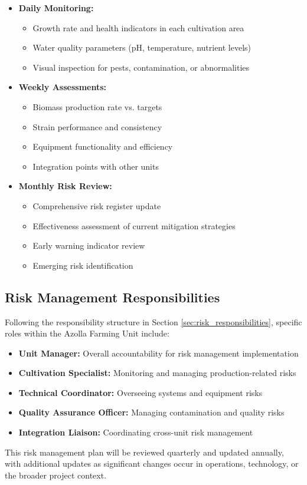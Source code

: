\begin{itemize}
    \item \textbf{Daily Monitoring:}
    \begin{itemize}
        \item Growth rate and health indicators in each cultivation area
        \item Water quality parameters (pH, temperature, nutrient levels)
        \item Visual inspection for pests, contamination, or abnormalities
    \end{itemize}
    
    \item \textbf{Weekly Assessments:}
    \begin{itemize}
        \item Biomass production rate vs. targets
        \item Strain performance and consistency
        \item Equipment functionality and efficiency
        \item Integration points with other units
    \end{itemize}
    
    \item \textbf{Monthly Risk Review:}
    \begin{itemize}
        \item Comprehensive risk register update
        \item Effectiveness assessment of current mitigation strategies
        \item Early warning indicator review
        \item Emerging risk identification
    \end{itemize}
\end{itemize}

\subsection{Risk Management Responsibilities}

Following the responsibility structure in Section \ref{sec:risk_responsibilities}, specific roles within the Azolla Farming Unit include:

\begin{itemize}
    \item \textbf{Unit Manager:} Overall accountability for risk management implementation
    \item \textbf{Cultivation Specialist:} Monitoring and managing production-related risks
    \item \textbf{Technical Coordinator:} Overseeing systems and equipment risks
    \item \textbf{Quality Assurance Officer:} Managing contamination and quality risks
    \item \textbf{Integration Liaison:} Coordinating cross-unit risk management
\end{itemize}

This risk management plan will be reviewed quarterly and updated annually, with additional updates as significant changes occur in operations, technology, or the broader project context.
